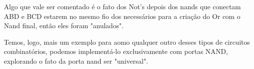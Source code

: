 \documentclass[12pt]{article}
\begin{document}
Algo que vale ser comentado é o fato dos Not's depois dos nands que conectam ABD e BCD estarem no mesmo fio dos necessários para a criação do Or com o Nand final, então eles foram "anulados".

Temos, logo, mais um exemplo para aomo qualquer outro desses tipos de circuitos combinatórios, podemos implementá-lo exclusivamente com portas NAND, explorando o fato da porta nand ser "universal".
\end{document}
